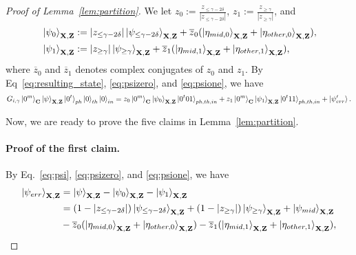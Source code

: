\begin{proof}[Proof of Lemma~\ref{lem:partition}]
We let $z_0:=\frac{z_{\leq \gamma-2\delta}}{|z_{\leq \gamma-2\delta}|}$, $z_1:=\frac{z_{\geq \gamma}}{|z_{\geq \gamma}|}$, and 
\begin{align}
&\ket{\psi_0}_{\mathbf{X},\mathbf{Z}}:=|z_{\leq \gamma-2\delta}|\ket{\psi_{\leq\gamma-2\delta}}_{\mathbf{X},\mathbf{Z}}+ \overline{z}_0(\ket{\eta_{mid,0}}_{\mathbf{X},\mathbf{Z}}+\ket{\eta_{other,0}}_{\mathbf{X},\mathbf{Z}}), \label{eq:psizero} \\
&\ket{\psi_1}_{\mathbf{X},\mathbf{Z}}:=|z_{\geq \gamma}|\ket{\psi_{\geq\gamma}}_{\mathbf{X},\mathbf{Z}}+ \overline{z}_1(\ket{\eta_{mid,1}}_{\mathbf{X},\mathbf{Z}}+\ket{\eta_{other,1}}_{\mathbf{X},\mathbf{Z}}), \label{eq:psione}
\end{align}
where $\overline{z}_0$ and $\overline{z}_1$ denotes complex conjugates of $z_0$ and $z_1$. By Eq~\ref{eq:resulting_state}, \ref{eq:psizero}, and \ref{eq:psione}, we have
\begin{align*}
    G_{i,\gamma} \ket{0^m}_{\mathbf{C}}\ket{\psi}_{\mathbf{X},\mathbf{Z}}\ket{0^t}_{ph}\ket{0}_{th}\ket{0}_{in} = z_0\ket{0^m}_{\mathbf{C}}\ket{\psi_{0}}_{\mathbf{X},\mathbf{Z}}\ket{0^t01}_{ph,th,in}+ z_1\ket{0^m}_{\mathbf{C}}\ket{\psi_{1}}_{\mathbf{X},\mathbf{Z}}\ket{0^t11}_{ph,th,in} + \ket{\psi'_{err}}.
\end{align*}

Now, we are ready to prove the five claims in Lemma~\ref{lem:partition}.

\paragraph{Proof of the first claim.}
By Eq.~\ref{eq:psi}, \ref{eq:psizero}, and \ref{eq:psione}, we have
\begin{align*}
\ket{\psi_{err}}_{\mathbf{X},\mathbf{Z}}&=\ket{\psi}_{\mathbf{X},\mathbf{Z}}-\ket{\psi_0}_{\mathbf{X},\mathbf{Z}}-\ket{\psi_1}_{\mathbf{X},\mathbf{Z}}\\
&=(1-|z_{\leq \gamma-2\delta}|)\ket{\psi_{\leq\gamma-2\delta}}_{\mathbf{X},\mathbf{Z}}+(1-|z_{\geq \gamma}|)\ket{\psi_{\geq\gamma}}_{\mathbf{X},\mathbf{Z}}+\ket{\psi_{mid}}_{\mathbf{X},\mathbf{Z}}\\
&-\overline{z}_0(\ket{\eta_{mid,0}}_{\mathbf{X},\mathbf{Z}}+\ket{\eta_{other,0}}_{\mathbf{X},\mathbf{Z}})
-\overline{z}_1(\ket{\eta_{mid,1}}_{\mathbf{X},\mathbf{Z}}+\ket{\eta_{other,1}}_{\mathbf{X},\mathbf{Z}}),
\end{align*}


\end{proof}
